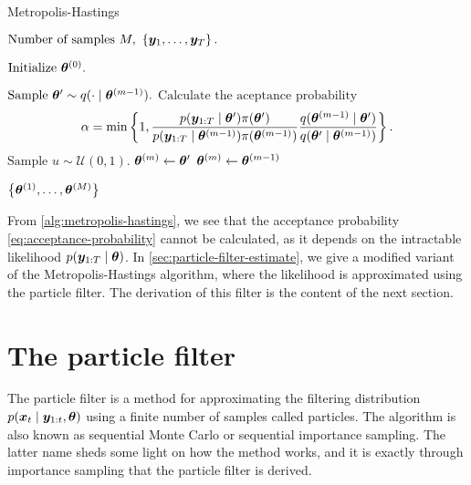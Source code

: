 \begin{algorithm}[ht]
    \caption{Metropolis-Hastings}
    \label{alg:metropolis-hastings}
    \begin{algorithmic}[1]
        \Input $\text{Number of samples } M,\ \left\{\by_1, \ldots, \by_T\right\}.$
        
        \State $\text{Initialize } \bm{\theta}^{(0)}.$
        
            \State $\text{Sample } \bm{\theta}^\prime \sim q(\cdot \mid \bm{\theta}^{(m-1)}).$
            \State $\text{Calculate the aceptance probability } $ \begin{equation} \label{eq:acceptance-probability}
            \alpha = \min \left\{1, \frac{p(\bm{y}_{1:T} \mid \bm{\theta}^\prime) \pi(\bm{\theta}^\prime)}{p(\bm{y}_{1:T} \mid \bm{\theta}^{(m-1)}) \pi(\bm{\theta}^{(m-1)})} \frac{q(\bm{\theta}^{(m-1)} \mid \bm{\theta}^\prime)}{q(\bm{\theta}^\prime \mid \bm{\theta}^{(m-1)})} \right\}.
            \end{equation}
            \State $\text{Sample } u \sim \mathcal{U}(0,1).$
                \State $\bm{\theta}^{(m)} \gets \bm{\theta}^\prime$ 
            \Else
                \State $\bm{\theta}^{(m)} \gets \bm{\theta}^{(m-1)}$ 
            \EndIf
        \EndFor
        
        \Output $\left\{ \bm{\theta}^{(1)}, \ldots, \bm{\theta}^{(M)} \right\}$
    \end{algorithmic}
\end{algorithm}

From \autoref{alg:metropolis-hastings}, we see that the acceptance probability \eqref{eq:acceptance-probability} cannot be calculated, as it depends on the intractable likelihood $p(\bm{y}_{1:T} \mid \bm{\theta})$. In \autoref{sec:particle-filter-estimate}, we give a modified variant of the Metropolis-Hastings algorithm, where the likelihood is approximated using the particle filter. The derivation of this filter is the content of the next section.



\section{The particle filter} \label{sec:particle-filter}
The particle filter \citep{particle-filter} is a method for approximating the filtering distribution $p(\bm{x}_t \mid \bm{y}_{1:t}, \bm{\theta})$ using a finite number of samples called particles. The algorithm is also known as sequential Monte Carlo or sequential importance sampling. The latter name sheds some light on how the method works, and it is exactly through importance sampling that the particle filter is derived.

